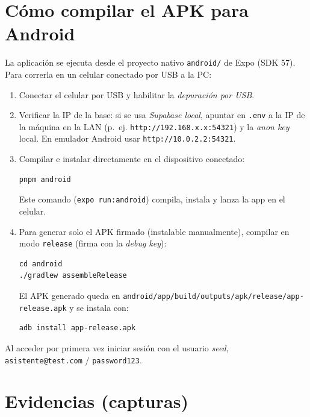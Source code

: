 \documentclass[11pt,a4paper]{article}
\begin{document}
\section{Cómo compilar el APK para Android}
\label{sec:demo}

La aplicación se ejecuta desde el proyecto nativo \texttt{android/} de Expo (SDK 57).
Para correrla en un celular conectado por USB a la PC:

\begin{enumerate}
  \item Conectar el celular por USB y habilitar la \emph{depuración por USB}.
  \item Verificar la IP de la base: si se usa \emph{Supabase local}, apuntar en \texttt{.env} a la
        IP de la máquina en la LAN (p.\ ej. \texttt{http://192.168.x.x:54321}) y la \emph{anon key}
        local. En emulador Android usar \texttt{http://10.0.2.2:54321}.
  \item Compilar e instalar directamente en el dispositivo conectado:

\begin{verbatim}
pnpm android
\end{verbatim}

Este comando (\texttt{expo run:android}) compila, instala y lanza la app en el celular.

  \item Para generar solo el APK firmado (instalable manualmente), compilar en modo
        \texttt{release} (firma con la \emph{debug key}):

\begin{verbatim}
cd android
./gradlew assembleRelease
\end{verbatim}

El APK generado queda en
\texttt{android/app/build/outputs/apk/release/app-release.apk} y se instala con:

\begin{verbatim}
adb install app-release.apk
\end{verbatim}

\end{enumerate}

Al acceder por primera vez iniciar sesión con el usuario \emph{seed},
\texttt{asistente@test.com} / \texttt{password123}.

\section{Evidencias (capturas)}
\label{sec:evidencias}
\end{document}

